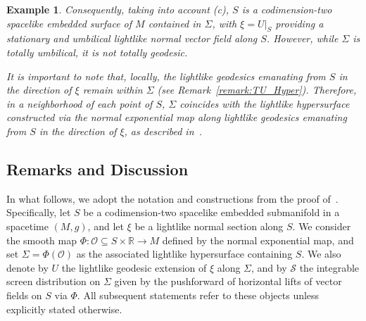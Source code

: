 \documentclass[11pt]{article}
\numberwithin{equation}{section}
\newtheorem{example}[theorem]{Example}
\begin{document}
\begin{example}
	Consequently, taking into account (c), \( S \) is a codimension-two spacelike embedded surface of \( M \) contained in \( \Sigma \), with \( \xi = U|_S \) providing a stationary and umbilical lightlike normal vector field along \( S \). However, while \( \Sigma \) is totally umbilical, it is not totally geodesic.
	
	It is important to note that, locally, the lightlike geodesics emanating from \( S \) in the direction of \( \xi \) remain within \( \Sigma \) (see Remark~\ref{remark:TU_Hyper}). Therefore, in a neighborhood of each point of \( S \), \( \Sigma \) coincides with the lightlike hypersurface constructed via the normal exponential map along lightlike geodesics emanating from \( S \) in the direction of \( \xi \), as described in~.
\end{example}



	\subsection{Remarks and Discussion}

	In what follows, we adopt the notation and constructions from the proof of~. Specifically, let $S$ be a codimension-two spacelike embedded submanifold in a spacetime $(M, g)$, and let $\xi$ be a lightlike normal section along $S$. We consider the smooth map $\Phi \colon \mathscr{O} \subseteq S \times \mathbb{R} \to M$ defined by the normal exponential map, and set $\Sigma = \Phi(\mathscr{O})$ as the associated lightlike hypersurface containing $S$. We also denote by $U$ the lightlike geodesic extension of $\xi$ along $\Sigma$, and by $\mathcal{S}$ the integrable screen distribution on $\Sigma$ given by the pushforward of horizontal lifts of vector fields on $S$ via $\Phi$. All subsequent statements refer to these objects unless explicitly stated otherwise.
	
\end{document}
